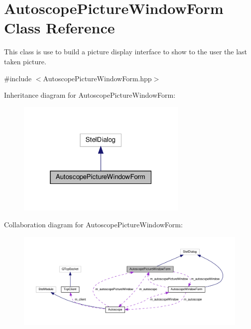 \hypertarget{class_autoscope_picture_window_form}{}\section{Autoscope\+Picture\+Window\+Form Class Reference}
\label{class_autoscope_picture_window_form}


This class is use to build a picture display interface to show to the user the last taken picture.  




{\ttfamily \#include $<$Autoscope\+Picture\+Window\+Form.\+hpp$>$}



Inheritance diagram for Autoscope\+Picture\+Window\+Form\+:\nopagebreak
\begin{figure}[H]
\begin{center}
\leavevmode
\includegraphics[width=232pt]{class_autoscope_picture_window_form__inherit__graph}
\end{center}
\end{figure}


Collaboration diagram for Autoscope\+Picture\+Window\+Form\+:
\nopagebreak
\begin{figure}[H]
\begin{center}
\leavevmode
\includegraphics[width=350pt]{class_autoscope_picture_window_form__coll__graph}
\end{center}
\end{figure}
